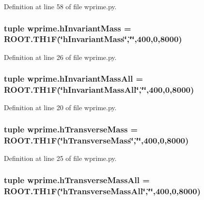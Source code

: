 Definition at line 58 of file wprime.\-py.

\subsubsection[{h\-Invariant\-Mass}]{\setlength{\rightskip}{0pt plus 5cm}tuple wprime.\-h\-Invariant\-Mass = R\-O\-O\-T.\-T\-H1\-F(\char`\"{}h\-Invariant\-Mass\char`\"{},\char`\"{}\char`\"{},400,0,8000)}\label{namespacewprime_a27c3f5d5e385cb00150833fedb9001c0}


Definition at line 26 of file wprime.\-py.

\subsubsection[{h\-Invariant\-Mass\-All}]{\setlength{\rightskip}{0pt plus 5cm}tuple wprime.\-h\-Invariant\-Mass\-All = R\-O\-O\-T.\-T\-H1\-F(\char`\"{}h\-Invariant\-Mass\-All\char`\"{},\char`\"{}\char`\"{},400,0,8000)}\label{namespacewprime_ad2dfae94ced65369bf5bcd8262a32357}


Definition at line 20 of file wprime.\-py.

\subsubsection[{h\-Transverse\-Mass}]{\setlength{\rightskip}{0pt plus 5cm}tuple wprime.\-h\-Transverse\-Mass = R\-O\-O\-T.\-T\-H1\-F(\char`\"{}h\-Transverse\-Mass\char`\"{},\char`\"{}\char`\"{},400,0,8000)}\label{namespacewprime_a7b192ad124dcdea0625bb9b0c55c6477}


Definition at line 25 of file wprime.\-py.

\subsubsection[{h\-Transverse\-Mass\-All}]{\setlength{\rightskip}{0pt plus 5cm}tuple wprime.\-h\-Transverse\-Mass\-All = R\-O\-O\-T.\-T\-H1\-F(\char`\"{}h\-Transverse\-Mass\-All\char`\"{},\char`\"{}\char`\"{},400,0,8000)}\label{namespacewprime_ab19f1148d5fadc7f1b06601d37f3bd98}


